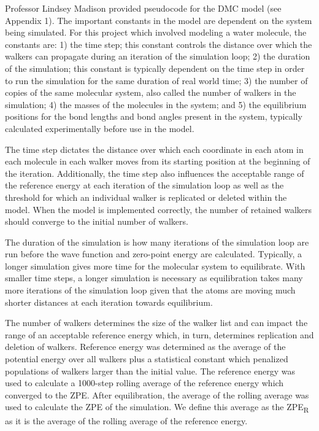 \documentclass[journal=jacsat,manuscript=article]{achemso}
\begin{document}
 Professor Lindsey Madison provided pseudocode for the DMC model (see Appendix 1). The important constants in the model are dependent on the system being simulated. For this project which involved modeling a water molecule, the constants are: 1) the time step; this constant controls the distance over which the walkers can propagate during an iteration of the simulation loop; 2) the duration of the simulation; this constant is typically dependent on the time step in order to run the simulation for the same duration of real world time; 3) the number of copies of the same molecular system, also called the number of walkers in the simulation; 4) the masses of the molecules in the system; and 5) the equilibrium positions for the bond lengths and bond angles present in the system, typically calculated experimentally before use in the model. 

The time step dictates the distance over which each coordinate in each atom in each molecule in each walker moves from its starting position at the beginning of the iteration. Additionally, the time step also influences the acceptable range of the reference energy at each iteration of the simulation loop as well as the threshold for which an individual walker is replicated or deleted within the model. When the model is implemented correctly, the number of retained walkers should converge to the initial number of walkers.

The duration of the simulation is how many iterations of the simulation loop are run before the wave function and zero-point energy are calculated. Typically, a longer simulation gives more time for the molecular system to equilibrate. With smaller time steps, a longer simulation is necessary as equilibration takes many more iterations of the simulation loop given that the atoms are moving much shorter distances at each iteration towards equilibrium. 

The number of walkers determines the size of the walker list and can impact the range of an acceptable reference energy which, in turn, determines replication and deletion of walkers. Reference energy was determined as the average of the potential energy over all walkers plus a statistical constant which penalized populations of walkers larger than the initial value. The reference energy was used to calculate a 1000-step rolling average of the reference energy which converged to the ZPE. After equilibration, the average of the rolling average was used to calculate the ZPE of the simulation. We define this average as the ZPE\textsubscript{R} as it is the average of the rolling average of the reference energy. 
\end{document}
